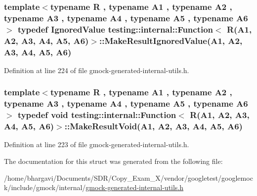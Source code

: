 \subsubsection[{\texorpdfstring{Make\+Result\+Ignored\+Value}{MakeResultIgnoredValue}}]{\setlength{\rightskip}{0pt plus 5cm}template$<$typename R , typename A1 , typename A2 , typename A3 , typename A4 , typename A5 , typename A6 $>$ typedef {\bf Ignored\+Value} {\bf testing\+::internal\+::\+Function}$<$ {\bf R}(A1, A2, A3, A4, A5, A6)$>$\+::Make\+Result\+Ignored\+Value(A1, A2, A3, A4, A5, A6)}\hypertarget{structtesting_1_1internal_1_1_function_3_01_r_07_a1_00_01_a2_00_01_a3_00_01_a4_00_01_a5_00_01_a6_08_4_a20c49ac827433a288921ca0caa0d319b}{}\label{structtesting_1_1internal_1_1_function_3_01_r_07_a1_00_01_a2_00_01_a3_00_01_a4_00_01_a5_00_01_a6_08_4_a20c49ac827433a288921ca0caa0d319b}


Definition at line 224 of file gmock-\/generated-\/internal-\/utils.\+h.

\subsubsection[{\texorpdfstring{Make\+Result\+Void}{MakeResultVoid}}]{\setlength{\rightskip}{0pt plus 5cm}template$<$typename R , typename A1 , typename A2 , typename A3 , typename A4 , typename A5 , typename A6 $>$ typedef void {\bf testing\+::internal\+::\+Function}$<$ {\bf R}(A1, A2, A3, A4, A5, A6)$>$\+::Make\+Result\+Void(A1, A2, A3, A4, A5, A6)}\hypertarget{structtesting_1_1internal_1_1_function_3_01_r_07_a1_00_01_a2_00_01_a3_00_01_a4_00_01_a5_00_01_a6_08_4_aa60c44ec945ca78297aaf7a3c785bce5}{}\label{structtesting_1_1internal_1_1_function_3_01_r_07_a1_00_01_a2_00_01_a3_00_01_a4_00_01_a5_00_01_a6_08_4_aa60c44ec945ca78297aaf7a3c785bce5}


Definition at line 223 of file gmock-\/generated-\/internal-\/utils.\+h.



The documentation for this struct was generated from the following file\+:\begin{DoxyCompactItemize}
\item 
/home/bhargavi/\+Documents/\+S\+D\+R/\+Copy\+\_\+\+Exam\+\_\+X/vendor/googletest/googlemock/include/gmock/internal/\hyperlink{gmock-generated-internal-utils_8h}{gmock-\/generated-\/internal-\/utils.\+h}\end{DoxyCompactItemize}
